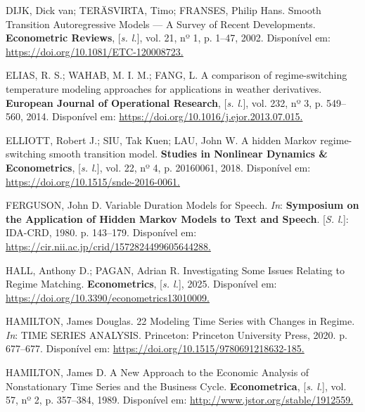 \documentclass[
  letterpaper,
  DIV=11,
  numbers=noendperiod]{scrartcl}
\newlength{\cslhangindent}
\newenvironment{CSLReferences}[2] %
 {\begin{list}{}{%
  \setlength{\itemindent}{0pt}
  \setlength{\leftmargin}{0pt}
  \setlength{\parsep}{0pt}
  \ifodd #1
   \setlength{\leftmargin}{\cslhangindent}
   \setlength{\itemindent}{-1\cslhangindent}
  \fi
  \setlength{\itemsep}{#2\baselineskip}}}
 {\end{list}}
\numberwithin{equation}{section}
\numberwithin{table}{section}
\numberwithin{figure}{section}
\begin{document}
\begin{CSLReferences}{0}{1}
DIJK, Dick van; TERÄSVIRTA, Timo; FRANSES, Philip Hans. Smooth
Transition Autoregressive Models --- A Survey of Recent Developments.
\textbf{Econometric Reviews}, {[}\emph{s. l.}{]}, vol. 21, nº 1, p.
1--47, 2002. Disponível em:
\href{https://doi.org/10.1081/ETC-120008723}{https://doi.org/10.1081/ETC-120008723.
}

ELIAS, R. S.; WAHAB, M. I. M.; FANG, L. A comparison of regime-switching
temperature modeling approaches for applications in weather derivatives.
\textbf{European Journal of Operational Research}, {[}\emph{s. l.}{]},
vol. 232, nº 3, p. 549--560, 2014. Disponível em:
\href{https://doi.org/10.1016/j.ejor.2013.07.015}{https://doi.org/10.1016/j.ejor.2013.07.015.
}

ELLIOTT, Robert J.; SIU, Tak Kuen; LAU, John W. A hidden Markov
regime-switching smooth transition model. \textbf{Studies in Nonlinear
Dynamics \& Econometrics}, {[}\emph{s. l.}{]}, vol. 22, nº 4, p.
20160061, 2018. Disponível em:
\href{https://doi.org/10.1515/snde-2016-0061}{https://doi.org/10.1515/snde-2016-0061.
}

FERGUSON, John D. Variable Duration Models for Speech. \emph{In}:
\textbf{Symposium on the Application of Hidden Markov Models to Text and
Speech}. {[}\emph{S. l.}{]}: IDA-CRD, 1980. p. 143--179. Disponível em:
\href{https://cir.nii.ac.jp/crid/1572824499605644288}{https://cir.nii.ac.jp/crid/1572824499605644288.
}

HALL, Anthony D.; PAGAN, Adrian R. Investigating Some Issues Relating to
Regime Matching. \textbf{Econometrics}, {[}\emph{s. l.}{]}, 2025.
Disponível em:
\href{https://doi.org/10.3390/econometrics13010009}{https://doi.org/10.3390/econometrics13010009.
}

HAMILTON, James Douglas. 22 Modeling Time Series with Changes in Regime.
\emph{In}: TIME SERIES ANALYSIS. Princeton: Princeton University Press,
2020. p. 677--677. Disponível em:
\href{https://doi.org/10.1515/9780691218632-185}{https://doi.org/10.1515/9780691218632-185.
}

HAMILTON, James D. A New Approach to the Economic Analysis of
Nonstationary Time Series and the Business Cycle. \textbf{Econometrica},
{[}\emph{s. l.}{]}, vol. 57, nº 2, p. 357--384, 1989. Disponível em:
\href{http://www.jstor.org/stable/1912559}{http://www.jstor.org/stable/1912559.
}


\end{CSLReferences}
\end{document}
